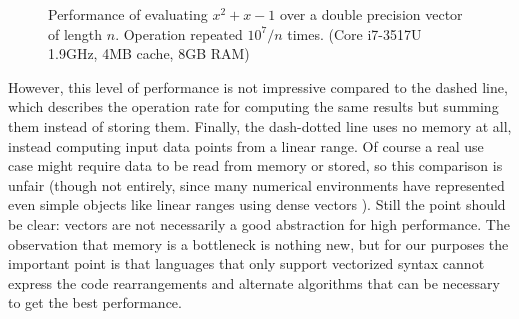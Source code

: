 {\begin{figure}[!t]

\caption{
\small{
  Performance of evaluating $x^2+x-1$ over a double precision vector of length $n$.
  Operation repeated $10^7/n$ times. (Core i7-3517U 1.9GHz, 4MB cache, 8GB RAM)
}
}
\label{fig:vecperf}
\end{figure}

However, this level of performance is not impressive compared to the
dashed line, which describes the operation rate for computing the
same results but summing them instead of storing them.
Finally, the dash-dotted line uses no memory at all, instead computing
input data points from a linear range.
Of course a real use case might require data to be read from memory or stored,
so this comparison is unfair (though not entirely, since many numerical
environments have represented even simple objects like linear ranges using
dense vectors \cite{matlabman:linspace}).
Still the point should be clear: vectors are not necessarily a good abstraction
for high performance.
The observation that memory is a bottleneck is nothing new, but for our purposes
the important point is that languages that only support vectorized syntax
cannot express the code rearrangements and alternate algorithms that can be
necessary to get the best performance.

}
